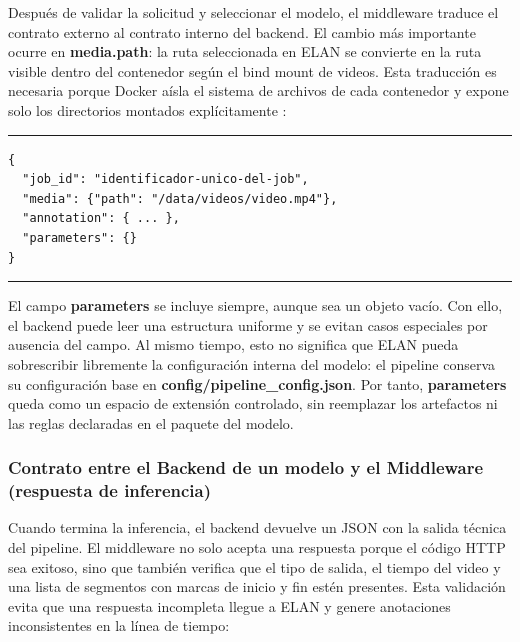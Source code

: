 Después de validar la solicitud y seleccionar el modelo, el middleware traduce el contrato externo al contrato interno del backend. El cambio más importante ocurre en \textbf{media.path}: la ruta seleccionada en ELAN se convierte en la ruta visible dentro del contenedor según el bind mount de videos. Esta traducción es necesaria porque Docker aísla el sistema de archivos de cada contenedor y expone solo los directorios montados explícitamente \cite{docker2026overview}:

\begin{center}
\begin{minipage}{0.70\textwidth}
\hrule
\vspace{0.12cm}
\footnotesize
\begin{Verbatim}[baselinestretch=0.78]
{
  "job_id": "identificador-unico-del-job",
  "media": {"path": "/data/videos/video.mp4"},
  "annotation": { ... },
  "parameters": {}
}
\end{Verbatim}
\vspace{0.05cm}
\hrule

\label{lst:payload_middleware_backend}
\end{minipage}
\end{center}

El campo \textbf{parameters} se incluye siempre, aunque sea un objeto vacío. Con ello, el backend puede leer una estructura uniforme y se evitan casos especiales por ausencia del campo. Al mismo tiempo, esto no significa que ELAN pueda sobrescribir libremente la configuración interna del modelo: el pipeline conserva su configuración base en \textbf{config/pipeline\_config.json}. Por tanto, \textbf{parameters} queda como un espacio de extensión controlado, sin reemplazar los artefactos ni las reglas declaradas en el paquete del modelo.

\subsubsection{Contrato entre el Backend de un modelo y el Middleware (respuesta de inferencia)}

Cuando termina la inferencia, el backend devuelve un JSON con la salida técnica del pipeline. El middleware no solo acepta una respuesta porque el código HTTP sea exitoso, sino que también verifica que el tipo de salida, el tiempo del video y una lista de segmentos con marcas de inicio y fin estén presentes. Esta validación evita que una respuesta incompleta llegue a ELAN y genere anotaciones inconsistentes en la línea de tiempo:

